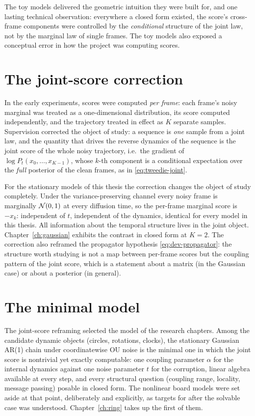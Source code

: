 The toy models delivered the geometric intuition they were built for,
and one lasting technical observation: everywhere a closed form
existed, the score's cross-frame components were controlled by the
\emph{conditional} structure of the joint law, not by the marginal law
of single frames. The toy models also exposed a conceptual error in
how the project was computing scores.

\section{The joint-score correction}\label{sec:dev-correction}

In the early experiments, scores were computed \emph{per frame}: each
frame's noisy marginal was treated as a one-dimensional distribution,
its score computed independently, and the trajectory treated in effect
as $K$ separate samples. Supervision corrected the object of study: a
sequence is \emph{one} sample from a joint law, and the quantity that
drives the reverse dynamics of the sequence is the joint score of the
whole noisy trajectory, i.e.\ the gradient of $\log P_t(x_0, \dots,
x_{K-1})$, whose $k$-th component is a conditional expectation over the
\emph{full} posterior of the clean frames, as in
\eqref{eq:tweedie-joint}.

For the stationary models of this thesis the correction changes the
object of study completely. Under the variance-preserving channel every
noisy frame is marginally $\mathcal{N}(0, 1)$ at every diffusion time, so the
per-frame marginal score is $-x_k$: independent of $t$, independent of
the dynamics, identical for every model in this thesis. All information
about the temporal structure lives in the joint object.
Chapter~\ref{ch:gaussian} exhibits the contrast in closed form at
$K = 2$. The correction also reframed the propagator hypothesis
\eqref{eq:dev-propagator}: the structure worth studying is not a map
between per-frame scores but the coupling pattern of the joint score,
which is a statement about a matrix (in the Gaussian case) or about a
posterior (in general).

\section{The minimal model}\label{sec:dev-minimal}

The joint-score reframing selected the model of the research chapters.
Among the candidate dynamic objects (circles, rotations, clocks), the
stationary Gaussian AR(1) chain under coordinatewise OU noise is the
minimal one in which the joint score is nontrivial yet exactly
computable: one coupling parameter $\alpha$ for the internal dynamics
against one noise parameter $t$ for the corruption, linear algebra
available at every step, and every structural question (coupling range,
locality, message passing) posable in closed form. The nonlinear board
models were set aside at that point, deliberately and explicitly, as targets
for after the solvable case was understood. Chapter~\ref{ch:ring} takes up the
first of them.

